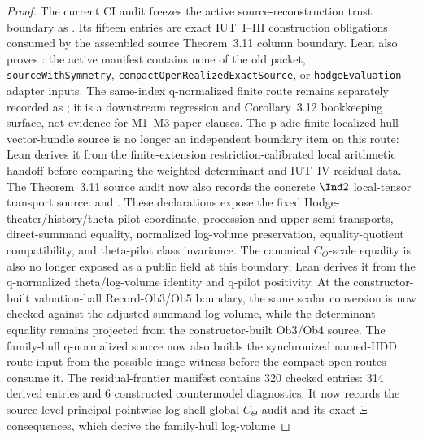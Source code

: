 \begin{proof}
  The current CI audit freezes the active source-reconstruction trust boundary as
  .
  Its fifteen entries are exact IUT~I--III construction obligations consumed
  by the assembled source Theorem~3.11 column boundary.  Lean also proves
  :
  the active manifest contains none of the old packet,
  \texttt{sourceWithSymmetry},
  \texttt{compactOpenRealizedExactSource}, or
  \texttt{hodgeEvaluation} adapter inputs.  The same-index q-normalized finite
  route remains separately recorded as
  ;
  it is a downstream regression and Corollary~3.12 bookkeeping surface, not
  evidence for M1--M3 paper clauses. The p-adic finite
  localized hull-vector-bundle source is no
  longer an independent boundary item on this route: Lean derives it from the
  finite-extension restriction-calibrated local arithmetic handoff before
  comparing the weighted determinant and IUT~IV residual data.  The
  Theorem~3.11 source audit now also records the concrete \(\Ind2\)
  local-tensor transport source:
  and
  .
  These declarations expose the fixed Hodge-theater/history/theta-pilot
  coordinate, procession and upper-semi transports, direct-summand equality,
  normalized log-volume preservation, equality-quotient compatibility, and
  theta-pilot class invariance.  The
  canonical \(C_\Theta\)-scale equality is also no longer exposed as a public
  field at this boundary; Lean derives it from the q-normalized
  theta/log-volume identity and q-pilot positivity.  At the constructor-built
  valuation-ball Record-Ob3/Ob5 boundary, the same scalar conversion is now
  checked against the adjusted-summand log-volume, while the determinant
  equality remains projected from the constructor-built Ob3/Ob4 source.  The
  family-hull q-normalized source now also builds the synchronized named-HDD
  route input from the possible-image witness before the compact-open routes
  consume it.  The residual-frontier manifest contains 320 checked entries: 314
  derived entries and 6 constructed countermodel diagnostics.  It now records
  the source-level principal pointwise log-shell global \(C_\Theta\) audit and
  its exact-\(\Xi\) consequences, which derive the family-hull log-volume

\end{proof}

